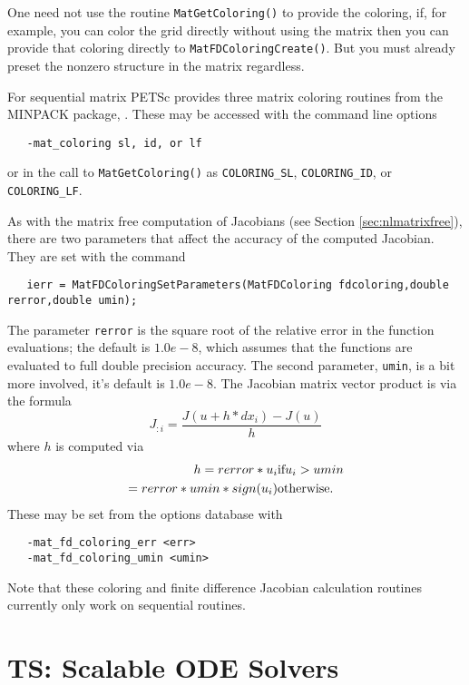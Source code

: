 One need not use the routine {\tt MatGetColoring()} to provide the coloring, if, for example,
you can color the grid directly without using the matrix then you can provide that coloring
directly to {\tt MatFDColoringCreate()}.  But you must already preset the nonzero 
structure in the matrix regardless.

For sequential matrix PETSc provides three matrix coloring routines from the 
MINPACK package, \cite{more84}. These may be accessed with the command line options
\begin{verbatim}
   -mat_coloring sl, id, or lf
\end{verbatim}
or in the call to {\tt MatGetColoring()} as {\tt COLORING\_SL}, {\tt COLORING\_ID}, or
{\tt COLORING\_LF}.   

As with the matrix free computation of Jacobians (see Section \ref{sec:nlmatrixfree}),
there are two parameters that affect the accuracy of the computed Jacobian.
They are set with the command
\begin{verbatim}
   ierr = MatFDColoringSetParameters(MatFDColoring fdcoloring,double rerror,double umin);
\end{verbatim}
The parameter {\tt rerror} is the square root of 
the 
relative error in the function evaluations; the default is $ 1.0e-8$, which assumes
that the functions are evaluated to full double precision accuracy. The 
second parameter, {\tt umin}, is a bit more involved, it's default is 
$ 1.0e-8$. The Jacobian matrix vector product is via the formula
\[
    J_{:i} = \frac{J(u + h*dx_{i}) - J(u)}{h}
\]
where $ h$ is computed via 
\begin{eqnarray*}
        h = rerror*u_{i}             &    \hbox{if}  u_{i} > umin \\
          = rerror*umin*sign(u_{i})  &    \hbox{otherwise}.
\end{eqnarray*}
These may be set from the options database with 
\begin{verbatim}
   -mat_fd_coloring_err <err>
   -mat_fd_coloring_umin <umin>
\end{verbatim}
 

Note that these coloring and finite difference Jacobian calculation routines currently 
only work on sequential routines.


\chapter{TS: Scalable ODE Solvers}

